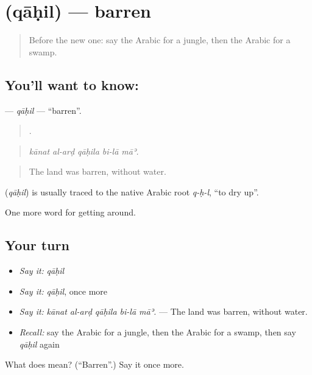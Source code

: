 \section[\texorpdfstring{\ar{قاحل} (qāḥil)}{قاحل (qāḥil)}]{ (qāḥil) — barren}

\label{lesson:AR-C473-qahil}



\begin{quote}
Before the new one: say the Arabic for a jungle, then the Arabic for a swamp.
\end{quote}

\subsection*{You'll want to know: }
\textbf{} — \emph{qāḥil} — \textquotedblleft{}barren\textquotedblright{}.

\begin{quote}
    .
\end{quote}

\begin{quote}
\emph{kānat al-arḍ qāḥila bi-lā māʾ.}
\end{quote}

\begin{quote}
The land was barren, without water.
\end{quote}

\begin{cousinweb}
\textbf{} (\emph{qāḥil}) is usually traced to the native Arabic root \emph{q-ḥ-l}, \textquotedblleft{}to dry up\textquotedblright{}.
\end{cousinweb}

\begin{grammarlens}[title={What you've built}]
One more word for getting around.
\end{grammarlens}

\subsection*{Your turn}
\begin{itemize}
\raggedright
  \item \emph{Say it:} \emph{qāḥil}
  \item \emph{Say it:} \emph{qāḥil}, once more
  \item \emph{Say it:} \emph{kānat al-arḍ qāḥila bi-lā māʾ.} — The land was barren, without water.
  \item \emph{Recall:} say the Arabic for a jungle, then the Arabic for a swamp, then say \emph{qāḥil} again
\end{itemize}

\begin{tcolorbox}[breakable,colback=teal!4,colframe=teal!35!black,title={Before you move on}]
What does  mean? (\textquotedblleft{}Barren\textquotedblright{}.) Say it once more.
\end{tcolorbox}
